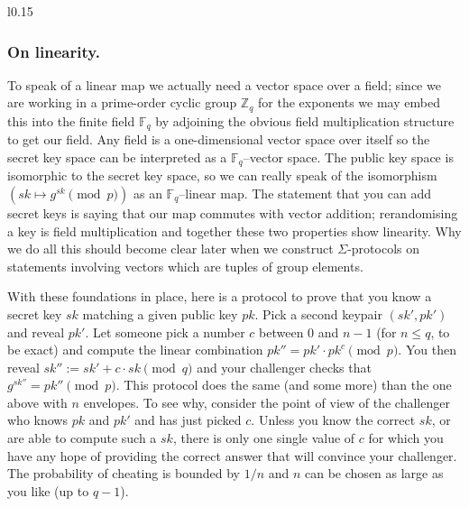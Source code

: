\documentclass[envcountsame]{llncs}
\newenvironment{maths}{\begin{framed}
\vspace{-12pt}
\begin{wrapfigure}{l}{0.15\textwidth}
\vspace{-12pt}\quad{\Huge $\sum$}
\end{wrapfigure}}{\end{framed}}
\begin{document}
\begin{maths}
\subsubsection{On linearity.}
To speak of a linear map we actually need a vector space over a field; since we
are working in a prime-order cyclic group $\mathbb Z_q$ for the exponents we may
embed this into the finite field $\mathbb F_q$ by adjoining the obvious field
multiplication structure to get our field. Any field is a one-dimensional vector
space over itself so the secret key space can be interpreted as a $\mathbb
F_q$--vector space. The public key space is isomorphic to the secret key space,
so we can really speak of the isomorphism $(sk \mapsto g^{sk} \pmod{p})$ as an
$\mathbb F_q$--linear map. The statement that you can add secret keys is saying
that our map commutes with vector addition; rerandomising a key is field
multiplication and together these two properties show linearity. Why we do all
this should become clear later when we construct $\Sigma$-protocols on
statements involving vectors which are tuples of group elements.
\end{maths}

With these foundations in place, here is a protocol to prove that you know a
secret key $sk$ matching a given public key $pk$. Pick a second keypair $(sk',
pk')$ and reveal $pk'$. Let someone pick a number $c$ between $0$ and $n - 1$
(for $n \leq q$, to be exact) and compute the linear combination $pk'' = pk'
\cdot pk^c \pmod{p}$. You then reveal $sk'' := sk' + c \cdot sk \pmod{q}$ and
your challenger checks that $g^{sk''} = pk'' \pmod{p}$. This protocol does the
same (and some more) than the one above with $n$ envelopes. To see why, consider
the point of view of the challenger who knows $pk$ and $pk'$ and has just
picked $c$. Unless you know the correct $sk$, or are able to compute such a
$sk$, there is only one single value of $c$ for which you have any hope of
providing the correct answer that will convince your challenger. The
probability of cheating is bounded by $1/n$ and $n$ can be chosen as large as
you like (up to $q-1$).
\end{document}
